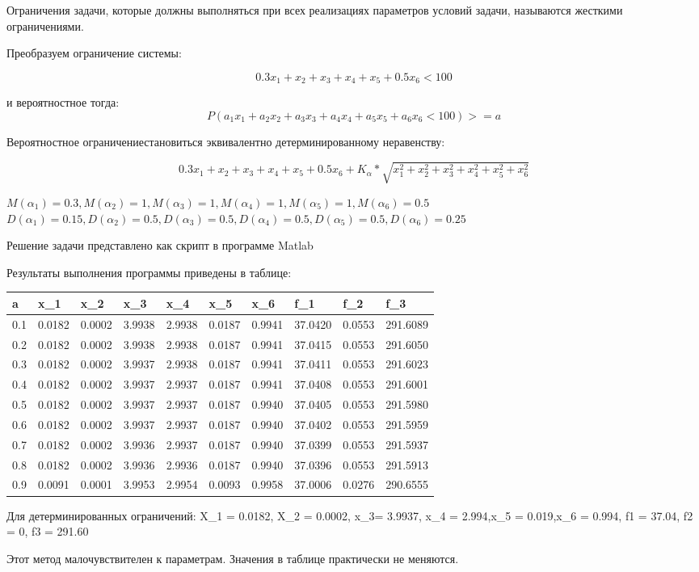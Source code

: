 \documentclass[14pt,a4paper,report]{report}
\begin{document}
Ограничения задачи, которые должны выполняться при всех реализациях параметров условий задачи, называются жесткими ограничениями. 

Преобразуем ограничение системы:
\begin{center}
$$ 0.3x_1+x_2+x_3+x_4+x_5+0.5x_6 < 100 $$
\end{center}

и вероятностное тогда:
$$ P(a_1x_1+a_2x_2+a_3x_3+a_4x_4+a_5x_5+a_6x_6 < 100)>=a $$

Вероятностное ограничениестановиться эквивалентно детерминированному неравенству:

$$ 0.3x_1+x_2+x_3+x_4+x_5+0.5x_6+ K_\alpha * \sqrt{x_1^2+x_2^2+x_3^2+x_4^2+x_5^2+x_6^2}$$

\begin{center}
$M(\alpha_{1})=0.3, M(\alpha_{2})=1, M(\alpha_{3})=1, M(\alpha_{4})=1, M(\alpha_{5})=1, M(\alpha_{6})=0.5$
$D(\alpha_{1})=0.15, D(\alpha_{2})=0.5, D(\alpha_{3})=0.5, D(\alpha_{4})=0.5, D(\alpha_{5})=0.5, D(\alpha_{6})=0.25$
\end{center}



Решение задачи представлено как скрипт в программе Matlab



Результаты выполнения программы приведены в таблице:

\begin{table}[h!]
\begin{tabular}{|l|l|l|l|l|l|l|l|l|l|}
\hline
a & x_1 & x_2 & x_3 & x_4 & x_5&x_6& f_1 & f_2 & f_3 \\ \hline
0.1& 0.0182& 0.0002& 3.9938& 2.9938& 0.0187& 0.9941& 37.0420& 0.0553& 291.6089 \\ \hline 
0.2& 0.0182& 0.0002& 3.9938& 2.9938& 0.0187& 0.9941& 37.0415& 0.0553& 291.6050 \\ \hline 
0.3& 0.0182& 0.0002& 3.9937& 2.9938& 0.0187& 0.9941& 37.0411& 0.0553& 291.6023 \\ \hline 
0.4& 0.0182& 0.0002& 3.9937& 2.9937& 0.0187& 0.9941& 37.0408& 0.0553& 291.6001 \\ \hline 
0.5& 0.0182& 0.0002& 3.9937& 2.9937& 0.0187& 0.9940& 37.0405& 0.0553& 291.5980 \\ \hline 
0.6& 0.0182& 0.0002& 3.9937& 2.9937& 0.0187& 0.9940& 37.0402& 0.0553& 291.5959 \\ \hline 
0.7& 0.0182& 0.0002& 3.9936& 2.9937& 0.0187& 0.9940& 37.0399& 0.0553& 291.5937 \\ \hline 
0.8& 0.0182& 0.0002& 3.9936& 2.9936& 0.0187& 0.9940& 37.0396& 0.0553& 291.5913 \\ \hline 
0.9& 0.0091& 0.0001& 3.9953& 2.9954& 0.0093& 0.9958& 37.0006& 0.0276& 290.6555 \\ \hline 
\end{tabular}
\end{table}



Для детерминированных ограничений:
X_1 = 0.0182, X_2 = 0.0002, x_3= 3.9937, x_4 =  2.994,x_5 =  0.019,x_6 =  0.994, f1 = 37.04, f2 = 0, f3 = 291.60


Этот метод малочувствителен к параметрам. Значения в таблице практически не меняются.
\end{document}
